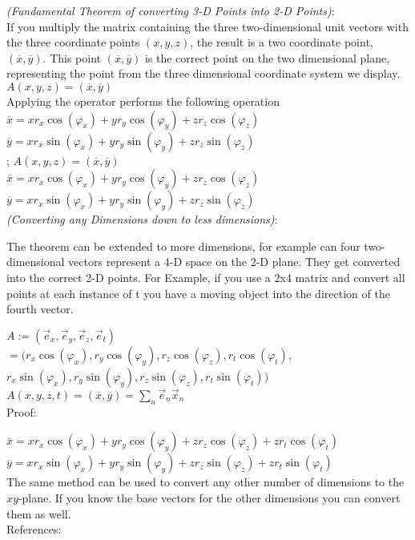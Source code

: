 \documentclass{article}
\begin{document}
 \emph{(Fundamental Theorem of converting 3-D Points into 2-D Points)}:\\

If you multiply the matrix containing the three two-dimensional unit vectors
with the three coordinate points $(x,y,z)$, the result is a two coordinate point, 
$(\overline{x},\overline{y})$. This point $(\overline{x},\overline{y})$ is the correct point on the two dimensional plane,
representing the point from the three dimensional coordinate system we display.\\


$A(x,y,z) = (\overline{x},\overline{y})$\\

Applying the operator performs the following operation\\

$\overline{x} = xr_x\cos(\varphi_x) + yr_y\cos(\varphi_y) + zr_z\cos(\varphi_z)$\\
$\overline{y} = xr_x\sin(\varphi_x) + yr_y\sin(\varphi_y) + zr_z\sin(\varphi_z)$\\

;
$A(x,y,z) = (\overline{x},\overline{y})$\\
$\overline{x} = xr_x\cos(\varphi_x) + yr_y\cos(\varphi_y) + zr_z\cos(\varphi_z)$\\
$\overline{y} = xr_x\sin(\varphi_x) + yr_y\sin(\varphi_y) + zr_z\sin(\varphi_z)$\\


 \emph{(Converting any Dimensions down to less dimensions)}:

The theorem can be extended to more dimensions, for example can four two-dimensional
vectors represent a 4-D space on the 2-D plane. They get converted into the correct
2-D points. For Example, if you use a 2x4 matrix and convert all points at each 
instance of t you have a moving object into the direction of the fourth vector. 

$A := (\vec{e}_x, \vec{e}_y, \vec{e}_z, \vec{e}_t)$\\
$  = (r_x\cos(\varphi_x), r_y\cos(\varphi_y), r_z\cos(\varphi_z), r_t\cos(\varphi_t),$\\
$     r_x\sin(\varphi_x), r_y\sin(\varphi_y), r_z\sin(\varphi_z), r_t\sin(\varphi_t))$\\

$A(x,y,z,t) = (\overline{x},\overline{y}) = \sum_{n} \vec{e}_n\vec{x}_n$\\

Proof:

$\overline{x} = xr_x\cos(\varphi_x) + yr_y\cos(\varphi_y) + zr_z\cos(\varphi_z) + zr_t\cos(\varphi_t)$\\
$\overline{y} = xr_x\sin(\varphi_x) + yr_y\sin(\varphi_y) + zr_z\sin(\varphi_z) + zr_t\sin(\varphi_t)$\\

The same method can be used to convert any other number of dimensions to the $xy$-plane.
If you know the base vectors for the other dimensions you can convert them as well.\\



References:
\end{document}

